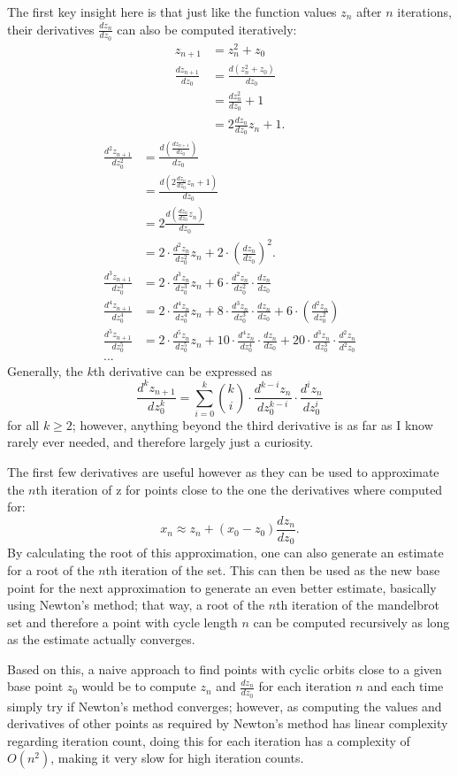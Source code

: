\documentclass[12pt,a4paper]{article}
\newcommand{\eqar}[1]{\begin{align*} #1 \end{align*}}
\begin{document}
The first key insight here is that just like the function values $z_n$ after $n$ iterations, their derivatives $\frac{dz_n}{dz_0}$ can also be computed iteratively:
\eqar{
	z_{n+1} &= z_n^2+z_0\\
	\frac{dz_{n+1}}{dz_0} &= \frac{d(z_n^2+z_0)}{dz_0}\\
	&= \frac{dz_n^2}{dz_0}+1\\
	&= 2\frac{dz_n}{dz_0}z_n+1.
}
\eqar{
	\frac{d^2z_{n+1}}{dz_0^2} &= \frac{d(\frac{dz_{n+1}}{dz_0})}{dz_0}\\
	&= \frac{d(2\frac{dz_n}{dz_0}z_n+1)}{dz_0}\\
	&= 2\frac{d(\frac{dz_n}{dz_0}z_n)}{dz_0}\\
	&= 2\cdot\frac{d^2z_n}{dz_0^2}z_n+2\cdot(\frac{dz_n}{dz_0})^2.\\
	\frac{d^3z_{n+1}}{dz_0^3} &= 2\cdot\frac{d^3z_n}{dz_0^3}z_n+6\cdot\frac{d^2z_n}{dz_0^2}\cdot\frac{dz_n}{dz_0}\\
	\frac{d^4z_{n+1}}{dz_0^4} &= 2\cdot\frac{d^4z_n}{dz_0^4}z_n+8\cdot\frac{d^3z_n}{dz_0^3}\cdot\frac{dz_n}{dz_0}+6\cdot(\frac{d^2z_n}{dz_0^2})\\
	\frac{d^5z_{n+1}}{dz_0^5} &= 2\cdot\frac{d^5z_n}{dz_0^5}z_n+10\cdot\frac{d^4z_n}{dz_0^4}\cdot\frac{dz_n}{dz_0}+20\cdot\frac{d^3z_n}{dz_0^3}\cdot\frac{d^2z_n}{d^2z_0}\\
	...
}
Generally, the $k$th derivative can be expressed as
$$\frac{d^kz_{n+1}}{dz_0^k} = \sum_{i=0}^{k}\binom{k}{i}\cdot\frac{d^{k-i}z_n}{dz_0^{k-i}}\cdot\frac{d^iz_n}{dz_0^i}$$
for all $k\geq2$; however, anything beyond the third derivative is as far as I know rarely ever needed, and therefore largely just a curiosity.

The first few derivatives are useful however as they can be used to approximate the $n$th iteration of z for points close to the one the derivatives where computed for:
$$x_n \approx z_n+(x_0-z_0)\frac{dz_n}{dz_0}.$$
By calculating the root of this approximation, one can also generate an estimate for a root of the $n$th iteration of the set. This can then be used as the new base point for the next approximation to generate an even better estimate, basically using Newton's method; that way, a root of the $n$th iteration of the mandelbrot set and therefore a point with cycle length $n$ can be computed recursively as long as the estimate actually converges.

Based on this, a naive approach to find points with cyclic orbits close to a given base point $z_0$ would be to compute $z_n$ and $\frac{dz_n}{dz_0}$ for each iteration $n$ and each time simply try if Newton's method converges; however, as computing the values and derivatives of other points as required by Newton's method has linear complexity regarding iteration count, doing this for each iteration has a complexity of $O(n^2)$, making it very slow for high iteration counts.
\end{document}
